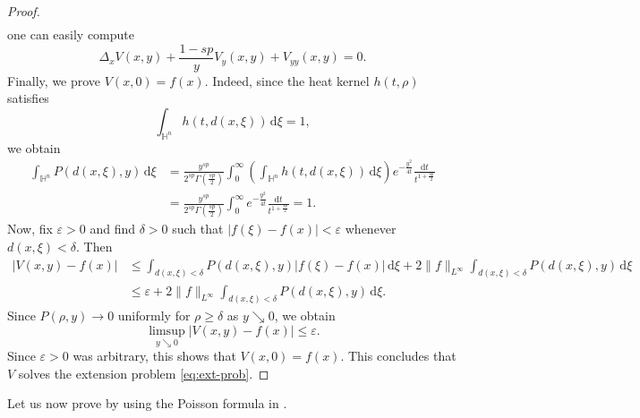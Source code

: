 \documentclass[11pt]{amsart}
\theoremstyle{plain}
\theoremstyle{definition}
\numberwithin{equation}{section}
\begin{document}
\begin{proof}
\begin{equation*}
\begin{split}
\end{split}
\end{equation*}
one can easily compute
\begin{equation*}
\Delta_{x} V(x,y) + \frac{1-sp}{y} V_{y}(x,y) + V_{yy}(x,y) = 0.
\end{equation*}
Finally, we prove $V(x,0) = f(x)$. Indeed, since the heat kernel $h(t, \rho)$ satisfies
\begin{equation*}
\int_{\mathbb{H}^{n}} h(t, d(x, \xi)) \,\mathrm{d}\xi = 1,
\end{equation*}
we obtain
\begin{equation*}
\begin{split}
\int_{\mathbb{H}^{n}} P(d(x,\xi), y) \,\mathrm{d}\xi
&= \frac{y^{sp}}{2^{sp}\Gamma(\frac{sp}{2})} \int_{0}^{\infty} \left( \int_{\mathbb{H}^{n}} h(t, d(x,\xi)) \,\mathrm{d}\xi \right) e^{-\frac{y^{2}}{4t}} \frac{\mathrm{d}t}{t^{1+\frac{sp}{2}}} \\
&= \frac{y^{sp}}{2^{sp}\Gamma(\frac{sp}{2})} \int_{0}^{\infty} e^{-\frac{y^{2}}{4t}} \frac{\mathrm{d}t}{t^{1+\frac{sp}{2}}} =1.
\end{split}
\end{equation*}
Now, fix $\varepsilon>0$ and find $\delta>0$ such that $|f(\xi)-f(x)|<\varepsilon$ whenever $d(x, \xi) < \delta$. Then
\begin{align*}
|V(x, y)-f(x)|
&\leq \int_{d(x, \xi)<\delta} P(d(x, \xi), y) |f(\xi)-f(x)| \,\mathrm{d}\xi + 2\|f\|_{L^\infty} \int_{d(x, \xi)<\delta} P(d(x, \xi), y) \,\mathrm{d}\xi \\
&\leq \varepsilon + 2\|f\|_{L^\infty} \int_{d(x, \xi)<\delta} P(d(x, \xi), y) \,\mathrm{d}\xi.
\end{align*}
Since $P(\rho, y) \to 0$ uniformly for $\rho \geq \delta$ as $y \searrow 0$, we obtain
\begin{equation*}
\limsup_{y \searrow 0} |V(x, y)-f(x)| \leq \varepsilon.
\end{equation*}
Since $\varepsilon>0$ was arbitrary, this shows that $V(x, 0)=f(x)$. This concludes that $V$ solves the extension problem \eqref{eq:ext-prob}.
\end{proof}

Let us now prove  by using the Poisson formula in .
\end{document}
